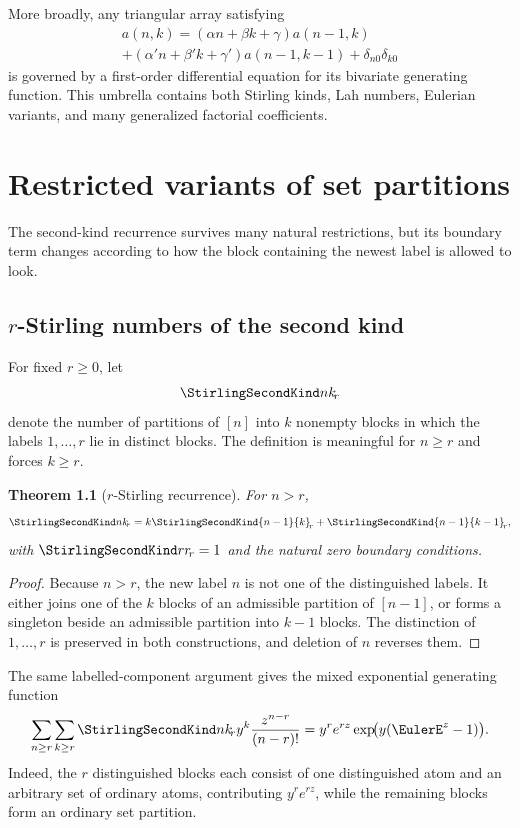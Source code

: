 \documentclass[11pt,a4paper,oneside,openany]{book}
\newtheorem{theorem}{Theorem}[chapter]
\theoremstyle{definition}
\theoremstyle{remark}
\begin{document}
More broadly, any triangular array satisfying
\begin{multline}\label{eq:triangular-general-recurrence}
 a(n,k)=(\alpha n+\beta k+\gamma)a(n-1,k)\\
 +(\alpha'n+\beta'k+\gamma')a(n-1,k-1)+\delta_{n0}\delta_{k0}
\end{multline}
is governed by a first-order differential equation for its bivariate generating
function.  This umbrella contains both Stirling kinds, Lah numbers, Eulerian
variants, and many generalized factorial coefficients.



\chapter{Restricted variants of set partitions}
\label{ch:stirling-variants}
The second-kind recurrence survives many natural restrictions, but its boundary
term changes according to how the block containing the newest label is allowed to
look.

\section{\texorpdfstring{$r$}{r}-Stirling numbers of the second kind}
For fixed $r\ge0$, let
\[
 \StirlingSecondKind nk_{\!r}
\]
denote the number of partitions of $[n]$ into $k$ nonempty blocks in which the
labels $1,\ldots,r$ lie in distinct blocks.  The definition is meaningful for
$n\ge r$ and forces $k\ge r$.

\begin{theorem}[$r$-Stirling recurrence]
\label{thm:r-stirling-recurrence}
For $n>r$,
\begin{equation}
\label{eq:r-stirling-recurrence}
 \StirlingSecondKind nk_{\!r}
 =k\StirlingSecondKind{n-1}{k}_{\!r}+\StirlingSecondKind{n-1}{k-1}_{\!r},
\end{equation}
with $\StirlingSecondKind rr_{\!r}=1$ and the natural zero boundary conditions.
\end{theorem}
\begin{proof}
Because $n>r$, the new label $n$ is not one of the distinguished labels.  It either
joins one of the $k$ blocks of an admissible partition of $[n-1]$, or forms a
singleton beside an admissible partition into $k-1$ blocks.  The distinction of
$1,\ldots,r$ is preserved in both constructions, and deletion of $n$ reverses
them.
\end{proof}

The same labelled-component argument gives the mixed exponential generating
function
\begin{equation}
\label{eq:r-stirling-egf}
 \sum_{n\ge r}\sum_{k\ge r}\StirlingSecondKind nk_{\!r}
 y^k\frac{z^{n-r}}{(n-r)!}
 =y^re^{rz}\exp\!\bigl(y(\EulerE^z-1)\bigr).
\end{equation}
Indeed, the $r$ distinguished blocks each consist of one distinguished atom and an
arbitrary set of ordinary atoms, contributing $y^re^{rz}$, while the remaining
blocks form an ordinary set partition.
\end{document}
